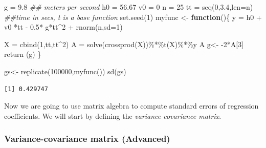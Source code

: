 \documentclass[
  letterpaper,
  DIV=11,
  numbers=noendperiod]{scrartcl}
\newenvironment{Shaded}{\begin{snugshade}}{\end{snugshade}}
\newcommand{\AttributeTok}[1]{\textcolor[rgb]{0.40,0.45,0.13}{#1}}
\newcommand{\ControlFlowTok}[1]{\textcolor[rgb]{0.00,0.23,0.31}{\textbf{#1}}}
\newcommand{\DecValTok}[1]{\textcolor[rgb]{0.68,0.00,0.00}{#1}}
\newcommand{\DocumentationTok}[1]{\textcolor[rgb]{0.37,0.37,0.37}{\textit{#1}}}
\newcommand{\FloatTok}[1]{\textcolor[rgb]{0.68,0.00,0.00}{#1}}
\newcommand{\FunctionTok}[1]{\textcolor[rgb]{0.28,0.35,0.67}{#1}}
\newcommand{\NormalTok}[1]{\textcolor[rgb]{0.00,0.23,0.31}{#1}}
\newcommand{\OtherTok}[1]{\textcolor[rgb]{0.00,0.23,0.31}{#1}}
\newcommand{\SpecialCharTok}[1]{\textcolor[rgb]{0.37,0.37,0.37}{#1}}
\begin{document}
\begin{Shaded}
\begin{Highlighting}[]
\NormalTok{g }\OtherTok{=} \FloatTok{9.8} \DocumentationTok{\#\# meters per second}
\NormalTok{h0 }\OtherTok{=} \FloatTok{56.67}
\NormalTok{v0 }\OtherTok{=} \DecValTok{0}
\NormalTok{n }\OtherTok{=} \DecValTok{25}
\NormalTok{tt }\OtherTok{=} \FunctionTok{seq}\NormalTok{(}\DecValTok{0}\NormalTok{,}\FloatTok{3.4}\NormalTok{,}\AttributeTok{len=}\NormalTok{n) }\DocumentationTok{\#\#time in secs, t is a base function}
\FunctionTok{set.seed}\NormalTok{(}\DecValTok{1}\NormalTok{)}
\NormalTok{myfunc }\OtherTok{\textless{}{-}} \ControlFlowTok{function}\NormalTok{()\{}
\NormalTok{y }\OtherTok{=}\NormalTok{ h0 }\SpecialCharTok{+}\NormalTok{ v0 }\SpecialCharTok{*}\NormalTok{tt  }\SpecialCharTok{{-}} \FloatTok{0.5}\SpecialCharTok{*}\NormalTok{ g}\SpecialCharTok{*}\NormalTok{tt}\SpecialCharTok{\^{}}\DecValTok{2} \SpecialCharTok{+} \FunctionTok{rnorm}\NormalTok{(n,}\AttributeTok{sd=}\DecValTok{1}\NormalTok{)}

\NormalTok{X }\OtherTok{=} \FunctionTok{cbind}\NormalTok{(}\DecValTok{1}\NormalTok{,tt,tt}\SpecialCharTok{\^{}}\DecValTok{2}\NormalTok{)}
\NormalTok{A }\OtherTok{=} \FunctionTok{solve}\NormalTok{(}\FunctionTok{crossprod}\NormalTok{(X))}\SpecialCharTok{\%*\%}\FunctionTok{t}\NormalTok{(X)}\SpecialCharTok{\%*\%}\NormalTok{y}
\NormalTok{A}
\NormalTok{g}\OtherTok{\textless{}{-}} \SpecialCharTok{{-}}\DecValTok{2}\SpecialCharTok{*}\NormalTok{A[}\DecValTok{3}\NormalTok{]}
\FunctionTok{return}\NormalTok{ (g)}
\NormalTok{\}}

\NormalTok{gs}\OtherTok{\textless{}{-}} \FunctionTok{replicate}\NormalTok{(}\DecValTok{100000}\NormalTok{,}\FunctionTok{myfunc}\NormalTok{())}
\FunctionTok{sd}\NormalTok{(gs)}
\end{Highlighting}
\end{Shaded}

\begin{verbatim}
[1] 0.429747
\end{verbatim}

Now we are going to use matrix algebra to compute standard errors of
regression coefficients. We will start by defining the \emph{variance
covariance matrix}.

\subsubsection{Variance-covariance matrix
(Advanced)}\label{variance-covariance-matrix-advanced}
\end{document}
